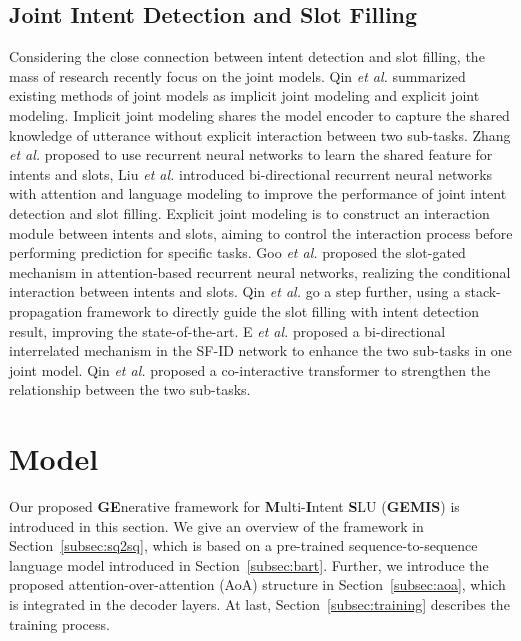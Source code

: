 \documentclass[11pt]{article}
\begin{document}
\subsection{Joint Intent Detection and Slot Filling}
Considering the close connection between intent detection and slot filling, the mass of research recently focus on the joint models. Qin \textit{et al.}\cite{DBLP:conf/ijcai/QinXC021} summarized existing methods of joint models as implicit joint modeling and explicit joint modeling. Implicit joint modeling shares the model encoder to capture the shared knowledge of utterance without explicit interaction between two sub-tasks. Zhang \textit{et al.}\cite{DBLP:conf/ijcai/ZhangW16a} proposed to use recurrent neural networks to learn the shared feature for intents and slots, Liu \textit{et al.}\cite{DBLP:conf/interspeech/LiuL16, DBLP:conf/sigdial/LiuL16} introduced bi-directional recurrent neural networks with attention and language modeling to improve the performance of joint intent detection and slot filling. Explicit joint modeling is to construct an interaction module between intents and slots, aiming to control the interaction process before performing prediction for specific tasks. Goo \textit{et al.}\cite{DBLP:conf/naacl/GooGHHCHC18} proposed the slot-gated mechanism in attention-based recurrent neural networks, realizing the conditional interaction between intents and slots. Qin \textit{et al.}\cite{DBLP:conf/emnlp/QinCLWL19} go a step further, using a stack-propagation framework to directly guide the slot filling with intent detection result, improving the state-of-the-art. E \textit{et al.}\cite{DBLP:conf/acl/ENCS19} proposed a bi-directional interrelated mechanism in the SF-ID network to enhance the two sub-tasks in one joint model. Qin \textit{et al.}\cite{DBLP:conf/icassp/QinLCKZ021} proposed a co-interactive transformer to strengthen the relationship between the two sub-tasks.

\section{Model}
\label{sec:method}

\par Our proposed \textbf{GE}nerative framework for \textbf{M}ulti-\textbf{I}ntent \textbf{S}LU (\textbf{GEMIS}) is introduced in this section. We give an overview of the framework in Section~\ref{subsec:sq2sq}, which is based on a pre-trained sequence-to-sequence language model introduced in Section~\ref{subsec:bart}. Further, we introduce the proposed attention-over-attention (AoA) structure in Section~\ref{subsec:aoa}, which is integrated in the decoder layers. At last, Section~\ref{subsec:training} describes the training process.
\end{document}
